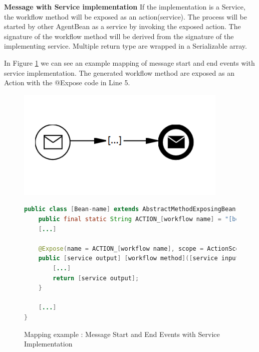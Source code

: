 \textbf{Message with Service implementation}
If the implementation is a Service, the workflow method will be exposed as an action(service). The process will be started by other AgentBean as a service by invoking the exposed action. The signature of the workflow method will be derived from the signature of the implementing service. 
Multiple return type are wrapped in a Serializable array. 

In Figure \ref{fig:message_service} we can see an example mapping of message start and end events with service implementation. The generated workflow method are exposed as an Action with the @Expose code in Line 5. 
\begin{figure}[h]
\begin{minipage}[c]{0.35\textwidth}
\includegraphics[width=0.9\textwidth]{images/mapping/messageStart.png}
\end{minipage}
\begin{minipage}[c]{0.65\textwidth}
\begin{lstlisting}[language = Java]
public class [Bean-name] extends AbstractMethodExposingBean{
	public final static String ACTION_[workflow name] = "[bean fullname]#[workflow method]"; 
	[...]
	
	@Expose(name = ACTION_[workflow name], scope = ActionScope.GLOBAL)
	public [service output] [workflow method]([service inputs]){
		[...]
		return [service output];
	}
	
	[...]
}
\end{lstlisting}
\end{minipage}
\caption{Mapping example : Message Start and End Events with Service Implementation}%
\label{fig:message_service}
\end{figure}


